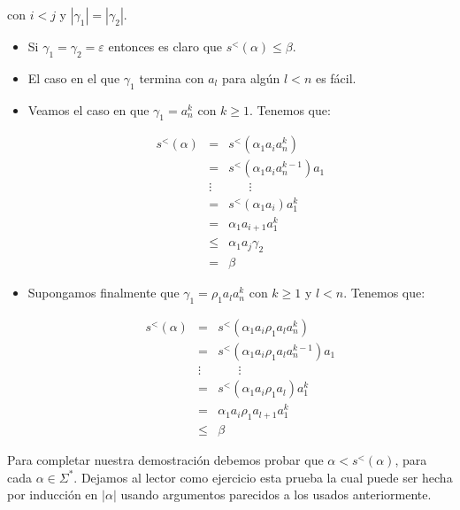     \par con $i < j$ y $\left\vert \gamma_{1} \right\vert = \left\vert \gamma_{2}\right\vert$.

    \begin{itemize}
      \item Si $\gamma_{1} = \gamma_{2} = \varepsilon$ entonces es claro que $s^{<}(\alpha) \leq \beta$.
      \item El caso en el que $\gamma_{1}$ termina con $a_{l}$ para algún $l < n$ es fácil.
      \item Veamos el caso en que $\gamma_{1} = a_{n}^{k}$ con $k \geq 1.$ Tenemos que:

        \begin{eqnarray}
          \nonumber s^{<}(\alpha ) & = & s^{<}(\alpha _{1}a_{i}a_{n}^{k}) \\
          \nonumber &=& s^{<}(\alpha_{1} a_{i} a_{n}^{k - 1}) a_{1} \\
          \nonumber &\vdots& \;\;\;\;\;\;\vdots \\
          \nonumber &=& s^{<}(\alpha_{1} a_{i}) a_{1}^{k} \\
          \nonumber &=& \alpha_{1} a_{i + 1} a_{1}^{k} \\
          \nonumber &\leq& \alpha_{1} a_{j} \gamma_{2} \\
          \nonumber &=& \beta
        \end{eqnarray}

      \item Supongamos finalmente que $\gamma_{1} = \rho_{1} a_{l} a_{n}^{k}$ con $k \geq 1$ y $l < n$. Tenemos que:

      \begin{eqnarray}
        \nonumber s^{<}(\alpha) &=& s^{<}(\alpha_{1} a_{i} \rho_{1} a_{l} a_{n}^{k}) \\
        \nonumber &=& s^{<}(\alpha_{1} a_{i} \rho_{1} a_{l} a_{n}^{k - 1}) a_{1} \\
        \nonumber &\vdots& \;\;\;\;\;\;\vdots \\
        \nonumber &=& s^{<}(\alpha_{1} a_{i} \rho_{1} a_{l}) a_{1}^{k} \\
        \nonumber &=& \alpha_{1} a_{i} \rho_{1} a_{l + 1} a_{1}^{k} \\
        \nonumber &\leq& \beta
      \end{eqnarray}
    \end{itemize}

    \par Para completar nuestra demostración debemos probar que $\alpha < s^{<}(\alpha)$, para cada $\alpha \in
    \Sigma ^{\ast}$. Dejamos al lector como ejercicio esta prueba la cual puede ser hecha por inducción en $\left\vert
    \alpha \right\vert$ usando argumentos parecidos a los usados anteriormente.

